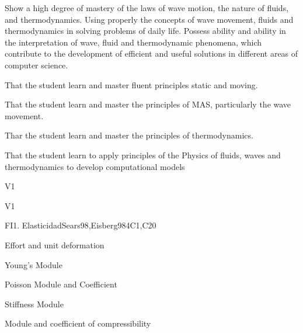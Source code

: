 \begin{syllabus}


\begin{justification}
Show a high degree of mastery of the laws of wave motion, the nature of fluids, and thermodynamics. Using properly the concepts of wave movement, fluids and thermodynamics in solving problems of daily life. Possess ability and ability in the interpretation of wave, fluid and thermodynamic phenomena, which contribute to the development of efficient and useful solutions in different areas of computer science.
\end{justification}

\begin{goals}
\item  That the student learn and master fluent principles static and moving.
\item  That the student learn and master the principles of MAS, particularly the wave movement.
\item  Thar the student learn and master the principles of thermodynamics.
\item  That the student learn to apply principles of the Physics of fluids, waves and thermodynamics to develop computational models
\end{goals}

\begin{outcomes}{V1}
  \item {}
  \item {}
  \item {}
\end{outcomes}

\begin{competences}{V1}
    \item {}
    \item {}
\end{competences}

\begin{unit}{FI1. Elasticidad}{}{Sears98,Eisberg98}{4}{C1,C20}
\begin{topics}
         \item  Effort and unit deformation
	 \item  Young's Module
         \item  Poisson Module and Coefficient
	 \item  Stiffness Module
         \item  Module and coefficient of compressibility
   \end{topics}


\end{unit}
\end{syllabus}
